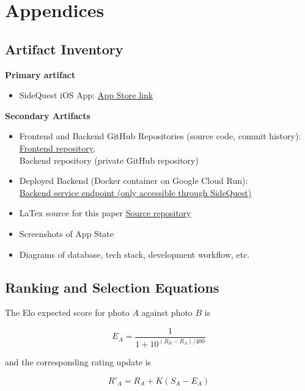 \documentclass[12pt,a4paper,oneside]{report}
\begin{document}
\appendix

\chapter{Appendices}
\label{ch:appendices}

\section{Artifact Inventory}
\label{sec:artifact-inventory}
\textbf{Primary artifact}
\begin{itemize}
  \item SideQuest iOS App: \href{https://apps.apple.com/us/app/sidequest-explore-challenge/id6753264647}{App Store link}
\end{itemize}

\textbf{Secondary Artifacts}
\begin{itemize}
  \item Frontend and Backend GitHub Repositories (source code, commit history): \\
  \href{https://github.com/ColdenJohnson/geoapp}{Frontend repository}, \\ Backend repository (private GitHub repository)
  \item Deployed Backend (Docker container on Google Cloud Run): \\
  \href{https://geode-backend-834952308922.us-central1.run.app/}{Backend service endpoint (only accessible through SideQuest)}
  \item LaTex source for this paper \href{https://github.com/MicCorn/SignatureWorkPaper_SideQuest}{Source repository}
  \item Screenshots of App State
  \item Diagrams of database, tech stack, development workflow, etc.
\end{itemize}

\section{Ranking and Selection Equations}
\label{sec:ranking}
The Elo expected score for photo $A$ against photo $B$ is

\[
E_A = \frac{1}{1 + 10^{(R_B - R_A)/400}}
\]

and the corresponding rating update is

\[
R'_A = R_A + K(S_A - E_A)
\]
\end{document}
